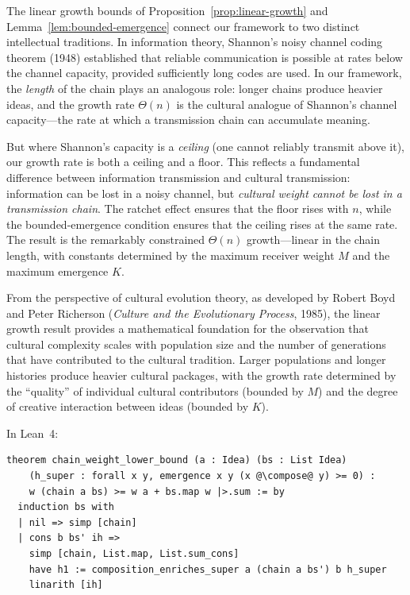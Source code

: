 \begin{interpretation}
\label{interp:ch8:shannon_cumulative}
The linear growth bounds of Proposition~\ref{prop:linear-growth} and
Lemma~\ref{lem:bounded-emergence} connect our framework to two distinct
intellectual traditions.  In information theory, Shannon's noisy channel
coding theorem (1948) established that reliable communication is possible
at rates below the channel capacity, provided sufficiently long codes are
used.  In our framework, the \emph{length} of the chain plays an analogous
role: longer chains produce heavier ideas, and the growth rate $\Theta(n)$
is the cultural analogue of Shannon's channel capacity---the rate at which a
transmission chain can accumulate meaning.

But where Shannon's capacity is a \emph{ceiling} (one cannot reliably
transmit above it), our growth rate is both a ceiling and a floor.  This
reflects a fundamental difference between information transmission and
cultural transmission: information can be lost in a noisy channel, but
\emph{cultural weight cannot be lost in a transmission chain}.  The ratchet
effect ensures that the floor rises with $n$, while the bounded-emergence
condition ensures that the ceiling rises at the same rate.  The result is
the remarkably constrained $\Theta(n)$ growth---linear in the chain length,
with constants determined by the maximum receiver weight $M$ and the maximum
emergence $K$.

From the perspective of cultural evolution theory, as developed by Robert
Boyd and Peter Richerson (\emph{Culture and the Evolutionary Process}, 1985),
the linear growth result provides a mathematical foundation for the
observation that cultural complexity scales with population size and the
number of generations that have contributed to the cultural tradition.
Larger populations and longer histories produce heavier cultural packages,
with the growth rate determined by the ``quality'' of individual cultural
contributors (bounded by $M$) and the degree of creative interaction
between ideas (bounded by $K$).
\end{interpretation}



In Lean~4:

\begin{lstlisting}
theorem chain_weight_lower_bound (a : Idea) (bs : List Idea)
    (h_super : forall x y, emergence x y (x @\compose@ y) >= 0) :
    w (chain a bs) >= w a + bs.map w |>.sum := by
  induction bs with
  | nil => simp [chain]
  | cons b bs' ih =>
    simp [chain, List.map, List.sum_cons]
    have h1 := composition_enriches_super a (chain a bs') b h_super
    linarith [ih]
\end{lstlisting}


